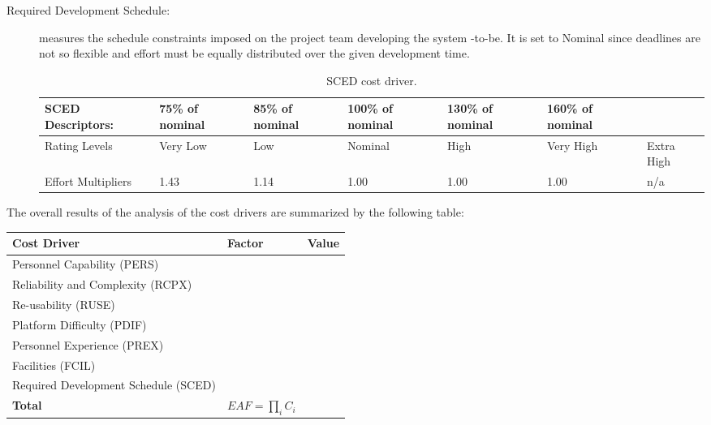 \begin{description}
\item[Required Development Schedule:] measures the schedule constraints imposed on the project team developing the system -to-be. It is set to Nominal since deadlines are not so flexible and effort must be equally distributed over the given development time.

\begin{table}[H]
	\begin{adjustwidth}{-.5in}{-.5in}
    \centering
    \begin{tabular}{p{3.6cm}|p{1.5cm}|p{1.5cm}|p{1.5cm}|p{1.5cm}|p{1.5cm}|p{1cm}}
    	\hline
        SCED Descriptors: & 75\% of nominal & 85\% of nominal & 100\% of nominal & 130\% of nominal & 160\% of nominal & \\
        \hline
        Rating Levels & Very Low & Low & Nominal & High & Very High & Extra High \\
        \hline
        Effort Multipliers & 1.43 & 1.14 & 1.00 & 1.00 & 1.00 & n/a \\
        \hline
    \end{tabular}
    \caption{SCED cost driver.}
    \end{adjustwidth}
\end{table}

\end{description}

\noindent
The overall results of the analysis of the cost drivers are summarized by the following table:

\begin{table}[H]
    \centering
    \begin{tabular}{l|l|l}
    	\hline
    	Cost Driver & Factor & Value \\
        \hline
        \hline
        Personnel Capability (PERS) & & \\
        \hline
        Reliability and Complexity (RCPX) & & \\
        \hline
        Re-usability (RUSE) & & \\
        \hline
        Platform Difficulty (PDIF) & & \\
        \hline
        Personnel Experience (PREX) & & \\
        \hline
        Facilities (FCIL) & & \\
        \hline
        Required Development Schedule (SCED) & & \\
        \hline
        \textbf{Total}  & $EAF=\prod_i C_i$ & \\
        \hline
    \end{tabular}
\end{table}

